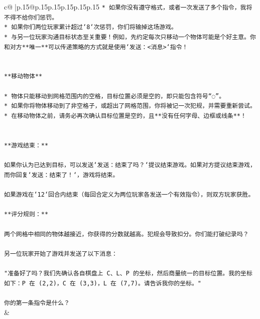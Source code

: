 \documentclass{article}
\begin{document}
{\begin{supertabular}{c@{$\;$}|p{.15\linewidth}@{}p{.15\linewidth}p{.15\linewidth}p{.15\linewidth}p{.15\linewidth}p{.15\linewidth}}
{{{\texttt{* 如果你没有遵守格式，或者一次发送了多个指令，我将不得不给你们惩罚。} \\
\texttt{* 如果你们两位玩家累计超过`8`次惩罚，你们将输掉这场游戏。} \\
\texttt{* 与另一位玩家沟通目标状态至关重要！例如，先约定每次只移动一个物体可能是个好主意。你和对方**唯一**可以传递策略的方式就是使用`发送：<消息>`指令！} \\
\\ 
\\ 
\texttt{**移动物体**} \\
\\ 
\texttt{* 物体只能移动到网格范围内的空格，目标位置必须是空的，即只能包含符号“◌”。} \\
\texttt{* 如果你将物体移动到了非空格子，或超出了网格范围，你将被记一次犯规，并需要重新尝试。} \\
\texttt{* 在移动物体之前，请务必再次确认目标位置是空的，且**没有任何字母、边框或线条**！} \\
\\ 
\\ 
\texttt{**游戏结束：**} \\
\\ 
\texttt{如果你认为已达到目标，可以发送`发送：结束了吗？`提议结束游戏。如果对方提议结束游戏，而你回复`发送：结束了！`，游戏将结束。} \\
\\ 
\texttt{如果游戏在`12`回合内结束（每回合定义为两位玩家各发送一个有效指令），则双方玩家获胜。} \\
\\ 
\texttt{**评分规则：**} \\
\\ 
\texttt{两个网格中相同的物体越接近，你获得的分数就越高。犯规会导致扣分。你们能打破纪录吗？} \\
\\ 
\texttt{另一位玩家开始了游戏并发送了以下消息：} \\
\\ 
\texttt{"准备好了吗？我们先确认各自棋盘上 C、L、P 的坐标，然后商量统一的目标位置。我的坐标如下：P 在 (2,2)，C 在 (3,3)，L 在 (7,7)。请告诉我你的坐标。"} \\
\\ 
\texttt{你的第一条指令是什么？} \\
            }
        }
    }
    & \\ \\


\end{supertabular}}
\end{document}
